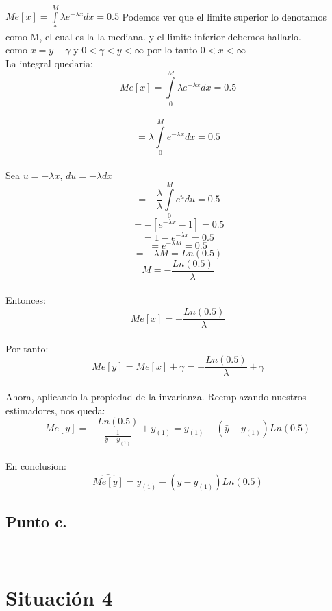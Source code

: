 \documentclass[letterpaper,12pt,onecolumn,titlepage]{article}
\begin{document}
~\\ $Me[x]=\int \limits_{?}^{M}\lambda e^{-\lambda x}dx=0.5$  Podemos ver que el limite superior lo denotamos como M, el cual es la la mediana. y el limite inferior debemos hallarlo.
~\\ como $x=y-\gamma$ y $0<\gamma<y<\infty$ por lo tanto $0<x<\infty$
~\\ La integral quedaria:
~\\ $$Me[x]=\int \limits_{0}^{M}\lambda e^{-\lambda x}dx=0.5$$
~\\ $$=\lambda \int \limits_{0}^{M} e^{-\lambda x}dx=0.5$$ 
~\\ Sea $u=-\lambda x$, $du=-\lambda dx$
~\\ $$=-\frac{\lambda}{\lambda}\int \limits_{0}^{M} e^{u} du=0.5$$
$$=-[e^{-\lambda x}-1]=0.5$$
$$=1-e^{-\lambda x}=0.5$$
$$=e^{-\lambda M}=0.5$$
$$=-\lambda M=Ln(0.5)$$
$$M=-\frac{Ln(0.5)}{\lambda}$$
~\\ Entonces:
$$Me[x]=-\frac{Ln(0.5)}{\lambda}$$
~\\ Por tanto:
$$Me[y]=Me[x]+\gamma=-\frac{Ln(0.5)}{\lambda}+\gamma$$
~\\ Ahora, aplicando la propiedad de la invarianza. Reemplazando nuestros estimadores, nos queda:
~\\ $$Me[y]=-\frac{Ln(0.5)}{\frac{1}{\bar{y}-y_{(1)}}}+y_{(1)}=y_{(1)}-(\bar{y}-y_{(1)})Ln(0.5)$$
~\\En conclusion:
$$\hat{Me[y]}=y_{(1)}-(\bar{y}-y_{(1)})Ln(0.5)$$
\subsection{Punto c.} 
~\\ 

\pagebreak\section{Situaci\'{o}n 4}
\end{document}
